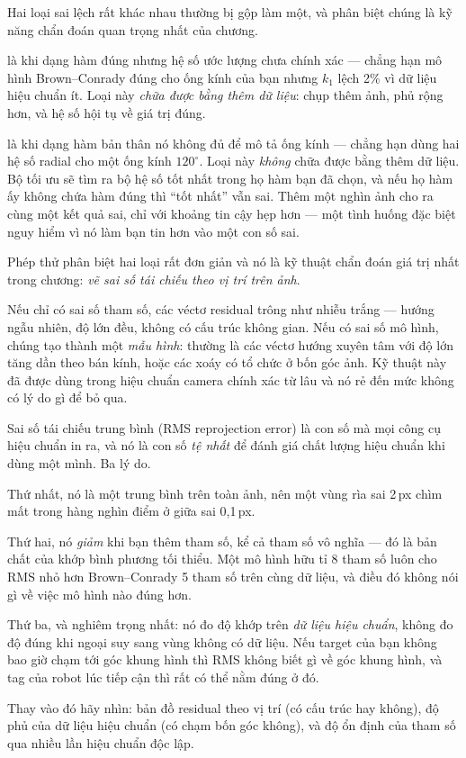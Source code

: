 \documentclass[../../marker.tex]{subfiles}
\begin{document}
Hai loại sai lệch rất khác nhau thường bị gộp làm một, và phân biệt chúng là kỹ năng chẩn đoán quan trọng nhất của chương.

 là khi dạng hàm đúng nhưng hệ số ước lượng chưa chính xác --- chẳng hạn mô hình Brown--Conrady đúng cho ống kính của bạn nhưng \(k_1\) lệch 2\% vì dữ liệu hiệu chuẩn ít. Loại này \emph{chữa được bằng thêm dữ liệu}: chụp thêm ảnh, phủ rộng hơn, và hệ số hội tụ về giá trị đúng.

 là khi dạng hàm bản thân nó không đủ để mô tả ống kính --- chẳng hạn dùng hai hệ số radial cho một ống kính \(120^\circ\). Loại này \emph{không} chữa được bằng thêm dữ liệu. Bộ tối ưu sẽ tìm ra bộ hệ số tốt nhất trong họ hàm bạn đã chọn, và nếu họ hàm ấy không chứa hàm đúng thì ``tốt nhất'' vẫn sai. Thêm một nghìn ảnh cho ra cùng một kết quả sai, chỉ với khoảng tin cậy hẹp hơn --- một tình huống đặc biệt nguy hiểm vì nó làm bạn tin hơn vào một con số sai.

Phép thử phân biệt hai loại rất đơn giản và nó là kỹ thuật chẩn đoán giá trị nhất trong chương: \emph{vẽ sai số tái chiếu theo vị trí trên ảnh}.

Nếu chỉ có sai số tham số, các véctơ residual trông như nhiễu trắng --- hướng ngẫu nhiên, độ lớn đều, không có cấu trúc không gian. Nếu có sai số mô hình, chúng tạo thành một \emph{mẫu hình}: thường là các véctơ hướng xuyên tâm với độ lớn tăng dần theo bán kính, hoặc các xoáy có tổ chức ở bốn góc ảnh. Kỹ thuật này đã được dùng trong hiệu chuẩn camera chính xác từ lâu \cite{beyer1992accurate} và nó rẻ đến mức không có lý do gì để bỏ qua.

\begin{cambay}
Sai số tái chiếu trung bình (RMS reprojection error) là con số mà mọi công cụ hiệu chuẩn in ra, và nó là con số \emph{tệ nhất} để đánh giá chất lượng hiệu chuẩn khi dùng một mình. Ba lý do.

Thứ nhất, nó là một trung bình trên toàn ảnh, nên một vùng rìa sai 2\,px chìm mất trong hàng nghìn điểm ở giữa sai 0,1\,px.

Thứ hai, nó \emph{giảm} khi bạn thêm tham số, kể cả tham số vô nghĩa --- đó là bản chất của khớp bình phương tối thiểu. Một mô hình hữu tỉ 8 tham số luôn cho RMS nhỏ hơn Brown--Conrady 5 tham số trên cùng dữ liệu, và điều đó không nói gì về việc mô hình nào đúng hơn.

Thứ ba, và nghiêm trọng nhất: nó đo độ khớp trên \emph{dữ liệu hiệu chuẩn}, không đo độ đúng khi ngoại suy sang vùng không có dữ liệu. Nếu target của bạn không bao giờ chạm tới góc khung hình thì RMS không biết gì về góc khung hình, và tag của robot lúc tiếp cận thì rất có thể nằm đúng ở đó.

Thay vào đó hãy nhìn: bản đồ residual theo vị trí (có cấu trúc hay không), độ phủ của dữ liệu hiệu chuẩn (có chạm bốn góc không), và độ ổn định của tham số qua nhiều lần hiệu chuẩn độc lập.
\end{cambay}
\end{document}
